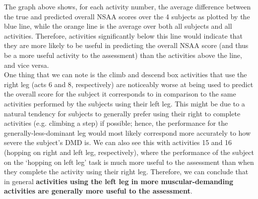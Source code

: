 \documentclass[12pt,twoside]{report}
\begin{document}
\quad The graph above shows, for each activity number, the average difference between the true and predicted overall NSAA scores over the 4 subjects as plotted by the blue line, while the orange line is the average over both all subjects and all activities. Therefore, activities significantly below this line would indicate that they are more likely to be useful in predicting the overall NSAA score (and thus be a more useful activity to the assessment) than the activities above the line, and vice versa.\\

\quad One thing that we can note is the climb and descend box activities that use the right leg (acts 6 and 8, respectively) are noticeably worse at being used to predict the overall score for the subject it corresponds to in comparison to the same activities performed by the subjects using their left leg. This might be due to a natural tendency for subjects to generally prefer using their right to complete activities (e.g. climbing a step) if possible; hence, the performance for the generally-less-dominant leg would most likely correspond more accurately to how severe the subject’s DMD is. We can also see this with activities 15 and 16 (hopping on right and left leg, respectively), where the performance of the subject on the ‘hopping on left leg’ task is much more useful to the assessment than when they complete the activity using their right leg. Therefore, we can conclude that in general \textbf{activities using the left leg in more muscular-demanding activities are generally more useful to the assessment}.\\
\end{document}
